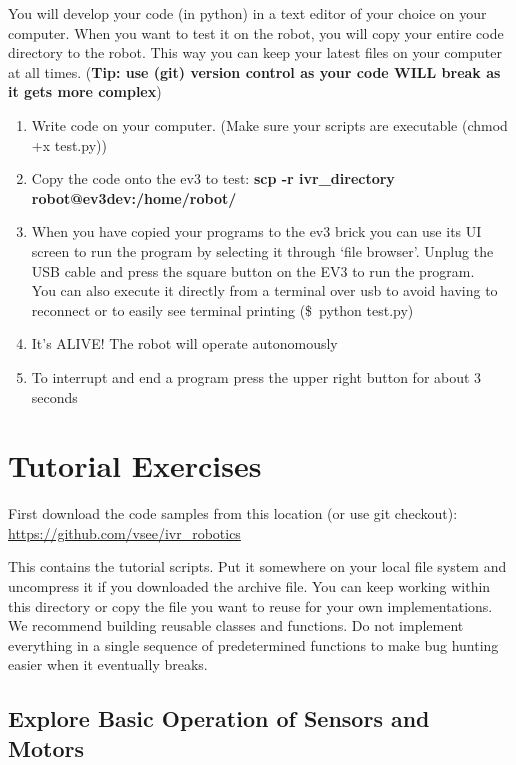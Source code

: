 \documentclass{article}
\begin{document}
  You will develop your code (in python) in a text editor of your choice on your computer. When 
  you want to test it on the robot, you will copy your entire code directory to the robot. This way 
  you can keep your latest files on your computer at all times. (\textbf{Tip: use (git) version control as your code WILL break as it gets more complex})
  \begin{enumerate}
      \item Write code on your computer. (Make sure your scripts are executable (chmod +x test.py))
      \item Copy the code onto the ev3 to test: \textbf{scp -r ivr\_directory robot@ev3dev:/home/robot/}
      \item When you have copied your programs to the ev3 brick you can use its UI screen to run
  the program by selecting it through ‘file browser’. Unplug the USB cable and press the 
  square button on the EV3 to run the program. \\ 
  You can also execute it directly from a terminal over usb to avoid having to 
  reconnect or to easily see terminal printing (\$~python test.py)

  \item It’s ALIVE! The robot will operate autonomously
  \item To interrupt and end a program press the upper right button for about 3 seconds

  \end{enumerate}



  \section{Tutorial Exercises}

  First download the code samples from this location (or use git checkout):\\
  \url{https://github.com/vsee/ivr\_robotics}

  This contains the tutorial scripts. Put it somewhere on your local file system
  and uncompress it if you downloaded the archive file. You can keep working within
  this directory or copy the file you want to reuse for your own implementations.
  We recommend building reusable classes and functions. Do not implement everything 
  in a single sequence of predetermined functions to make bug hunting easier when it 
  eventually breaks. 
  
  \subsection{Explore Basic Operation of Sensors and Motors}
\end{document}
